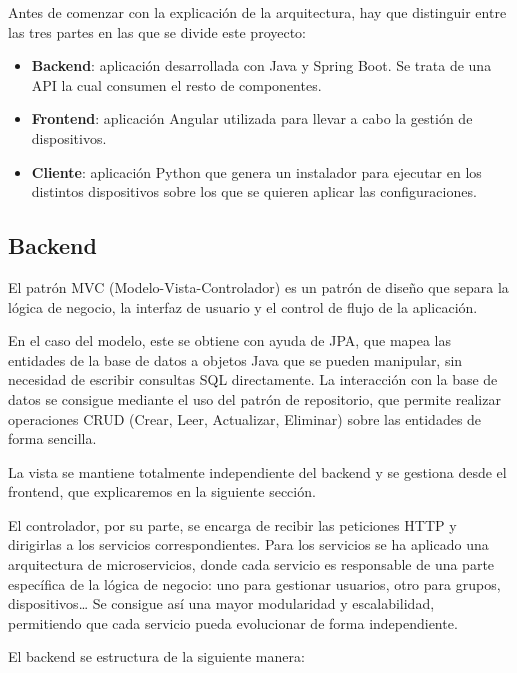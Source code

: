 Antes de comenzar con la explicación de la arquitectura, hay que distinguir entre las tres partes en las que se divide este proyecto:
\begin{itemize}
    \item \textbf{Backend}: aplicación desarrollada con Java y Spring Boot.
    Se trata de una API la cual consumen el resto de componentes.
    \item \textbf{Frontend}: aplicación Angular utilizada para llevar a cabo la gestión de dispositivos.
    \item \textbf{Cliente}: aplicación Python que genera un instalador para ejecutar en los distintos dispositivos
    sobre los que se quieren aplicar las configuraciones.
\end{itemize}

\subsection{Backend}


El patrón MVC (Modelo-Vista-Controlador) es un patrón de diseño que separa la lógica de negocio, la interfaz de usuario
y el control de flujo de la aplicación\cite{springMvc}.

En el caso del modelo, este se obtiene con ayuda de JPA, que mapea las entidades de la base de datos a objetos Java que se
pueden manipular, sin necesidad de escribir consultas SQL directamente.
La interacción con la base de datos se consigue mediante el uso del patrón de repositorio, que permite realizar
operaciones CRUD (Crear, Leer, Actualizar, Eliminar) sobre las entidades de forma sencilla.

La vista se mantiene totalmente independiente del backend y se gestiona desde el frontend, que explicaremos en la
siguiente sección.

El controlador, por su parte, se encarga de recibir las peticiones HTTP y dirigirlas a los servicios correspondientes.
Para los servicios se ha aplicado una arquitectura de microservicios, donde cada servicio es responsable de una
parte específica de la lógica de negocio: uno para gestionar usuarios, otro para grupos, dispositivos\ldots
Se consigue así una mayor modularidad y escalabilidad, permitiendo que cada servicio pueda evolucionar de forma
independiente.

El backend se estructura de la siguiente manera:

